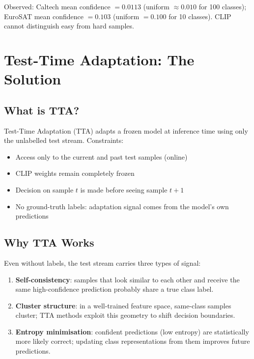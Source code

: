 \documentclass[12pt,a4paper]{article}
\newcommand{\1}{\mathbf{1}}
\begin{document}
Observed: Caltech mean confidence $= 0.0113$ (uniform $\approx 0.010$ for 100 classes); EuroSAT mean confidence $= 0.103$ (uniform $= 0.100$ for 10 classes).
CLIP cannot distinguish easy from hard samples.

\section{Test-Time Adaptation: The Solution}

\subsection{What is TTA?}

Test-Time Adaptation (TTA) adapts a frozen model at inference time using only the unlabelled test stream.
Constraints:
\begin{itemize}[noitemsep]
  \item Access only to the current and past test samples (online)
  \item CLIP weights remain completely frozen
  \item Decision on sample $t$ is made before seeing sample $t+1$
  \item No ground-truth labels: adaptation signal comes from the model's own predictions
\end{itemize}

\subsection{Why TTA Works}

Even without labels, the test stream carries three types of signal:
\begin{enumerate}[leftmargin=1.5em,noitemsep]
  \item \textbf{Self-consistency}: samples that look similar to each other and receive the same high-confidence prediction probably share a true class label.
  \item \textbf{Cluster structure}: in a well-trained feature space, same-class samples cluster; TTA methods exploit this geometry to shift decision boundaries.
  \item \textbf{Entropy minimisation}: confident predictions (low entropy) are statistically more likely correct; updating class representations from them improves future predictions.
\end{enumerate}
\end{document}
